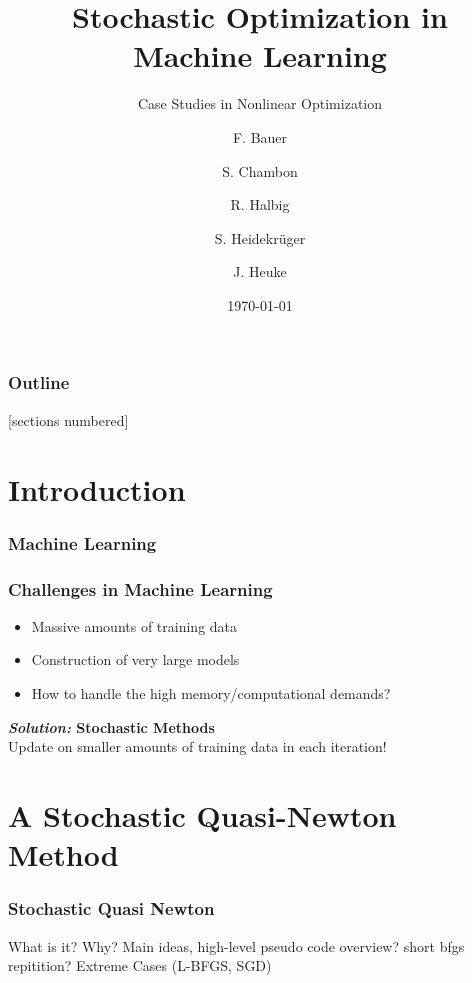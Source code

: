 \documentclass[10pt]{beamer}
\title{Stochastic Optimization in Machine Learning}
\subtitle{Case Studies in Nonlinear Optimization}
\date{\today}
\author{F. Bauer \and S. Chambon \and R. Halbig \and S. Heidekrüger \and J. Heuke}
\institute{Technische Universität München}
\begin{document}
\maketitle



\begin{frame}
  \frametitle{Outline}
  [sections numbered]
  \tableofcontents[hideallsubsections]
\end{frame}

\section{Introduction}

  \begin{frame}[t]\frametitle{Machine Learning}
        
  \end{frame}

  \begin{frame}
    \frametitle{Challenges in Machine Learning}
      \begin{itemize}
        \item Massive amounts of training data 
        \item Construction of very large models
        \item How to handle the high memory/computational demands?
      \end{itemize}
      \vspace{36pt}
      \pause 
    \textbf{\emph{Solution:} \alert{Stochastic Methods}}\\Update on smaller amounts of training data in each iteration!
  \end{frame}

\section{A Stochastic Quasi-Newton Method}

  \begin{frame}
    \frametitle{Stochastic Quasi Newton}
      What is it?
      Why?
      Main ideas, high-level pseudo code overview?
      short bfgs repitition?
      Extreme Cases (L-BFGS, SGD)
  \end{frame}
\end{document}
